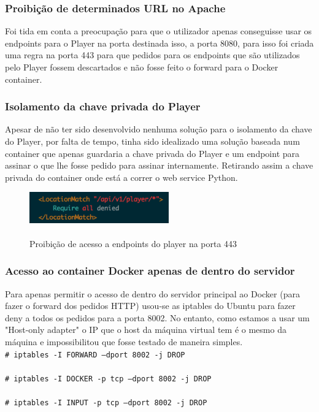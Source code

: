 \documentclass[pdftex,12pt,a4paper]{report}
\newcommand{\shellcmd}[1]{\\\indent\indent\texttt{\footnotesize\# #1}\\}
\begin{document}
\subsubsection{Proibição de determinados URL no Apache}

Foi tida em conta a preocupação para que o utilizador apenas conseguisse usar os endpoints para o Player na porta destinada isso, a porta 8080, para isso foi criada uma regra na porta 443 para que pedidos para os endpoints que são utilizados pelo Player fossem descartados e não fosse feito o forward para o Docker container.

\subsubsection{Isolamento da chave privada do Player}

Apesar de não ter sido desenvolvido nenhuma solução para o isolamento da chave do Player, por falta de tempo, tinha sido idealizado uma solução baseada num container que apenas guardaria a chave privada do Player e um endpoint para assinar o que lhe fosse pedido para assinar internamente. Retirando assim a chave privada do container onde está a correr o web service Python.

\begin{figure}[!htb]
\center
 \includegraphics[width=60mm,scale=1]{player_denied.png}
 \caption{\\Proibição de acesso a endpoints do player na porta 443}
 \label{fig:docker_c}
\end{figure}

\subsubsection{Acesso ao container Docker apenas de dentro do servidor}

Para apenas permitir o acesso de dentro do servidor principal ao Docker (para fazer o forward dos pedidos HTTP) usou-se as iptables do Ubuntu para fazer deny a todos os pedidos para a porta 8002. No entanto, como estamos a usar um "Host-only adapter" o IP que o host da máquina virtual tem é o mesmo da máquina e impossibilitou que fosse testado de maneira simples.
\shellcmd{iptables -I FORWARD  --dport 8002 -j DROP}
\shellcmd{iptables -I DOCKER -p tcp --dport 8002 -j DROP}
\shellcmd{iptables -I INPUT -p tcp --dport 8002 -j DROP}
\end{document}
